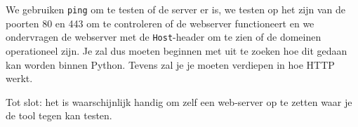 We gebruiken \texttt{ping} om te testen of de server er is, we testen op het  zijn van de poorten 80 en 443 om te controleren of de webserver functioneert en we ondervragen de webserver met de \texttt{Host}-header om te zien of de domeinen operationeel zijn. Je zal dus moeten beginnen met uit te zoeken hoe dit gedaan kan worden binnen Python. Tevens zal je je moeten verdiepen in hoe HTTP werkt.

Tot slot: het is waarschijnlijk handig om zelf een web-server op te zetten waar je de tool tegen kan testen.

